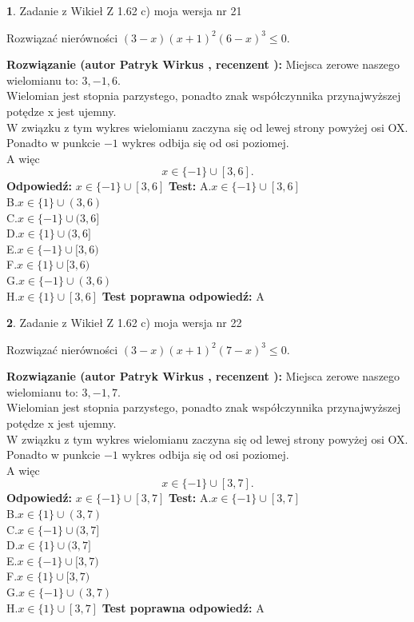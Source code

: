 \documentclass[12pt, a4paper]{article}
\theoremstyle{definition} %
\newtheorem{zad}{}
\newcommand{\zadStart}[1]{\begin{zad}#1\newline}
\newcommand{\zadStop}{\end{zad}}
\newcommand{\rozwStart}[2]{\noindent \textbf{Rozwiązanie (autor #1 , recenzent #2): }\newline}
\newcommand{\rozwStop}{\newline}
\newcommand{\odpStart}{\noindent \textbf{Odpowiedź:}\newline}
\newcommand{\odpStop}{\newline}
\newcommand{\testStart}{\noindent \textbf{Test:}\newline}
\newcommand{\testStop}{\newline}
\newcommand{\kluczStart}{\noindent \textbf{Test poprawna odpowiedź:}\newline}
\newcommand{\kluczStop}{\newline}
\begin{document}
\zadStart{Zadanie z Wikieł Z 1.62 c) moja wersja nr 21}

Rozwiązać nierówności $(3-x)(x+1)^{2}(6-x)^{3}\le0$.
\zadStop
\rozwStart{Patryk Wirkus}{}
Miejsca zerowe naszego wielomianu to: $3, -1, 6$.\\
Wielomian jest stopnia parzystego, ponadto znak współczynnika przy\linebreak najwyższej potędze x jest ujemny.\\ W związku z tym wykres wielomianu zaczyna się od lewej strony powyżej osi OX.\\
Ponadto w punkcie $-1$ wykres odbija się od osi poziomej.\\
A więc $$x \in \{-1\} \cup [3,6].$$
\rozwStop
\odpStart
$x \in \{-1\} \cup [3,6]$
\odpStop
\testStart
A.$x \in \{-1\} \cup [3,6]$\\
B.$x \in \{1\} \cup (3,6)$\\
C.$x \in \{-1\} \cup (3,6]$\\
D.$x \in \{1\} \cup (3,6]$\\
E.$x \in \{-1\} \cup [3,6)$\\
F.$x \in \{1\} \cup [3,6)$\\
G.$x \in \{-1\} \cup (3,6)$\\
H.$x \in \{1\} \cup [3,6]$
\testStop
\kluczStart
A
\kluczStop



\zadStart{Zadanie z Wikieł Z 1.62 c) moja wersja nr 22}

Rozwiązać nierówności $(3-x)(x+1)^{2}(7-x)^{3}\le0$.
\zadStop
\rozwStart{Patryk Wirkus}{}
Miejsca zerowe naszego wielomianu to: $3, -1, 7$.\\
Wielomian jest stopnia parzystego, ponadto znak współczynnika przy\linebreak najwyższej potędze x jest ujemny.\\ W związku z tym wykres wielomianu zaczyna się od lewej strony powyżej osi OX.\\
Ponadto w punkcie $-1$ wykres odbija się od osi poziomej.\\
A więc $$x \in \{-1\} \cup [3,7].$$
\rozwStop
\odpStart
$x \in \{-1\} \cup [3,7]$
\odpStop
\testStart
A.$x \in \{-1\} \cup [3,7]$\\
B.$x \in \{1\} \cup (3,7)$\\
C.$x \in \{-1\} \cup (3,7]$\\
D.$x \in \{1\} \cup (3,7]$\\
E.$x \in \{-1\} \cup [3,7)$\\
F.$x \in \{1\} \cup [3,7)$\\
G.$x \in \{-1\} \cup (3,7)$\\
H.$x \in \{1\} \cup [3,7]$
\testStop
\kluczStart
A
\kluczStop
\end{document}
